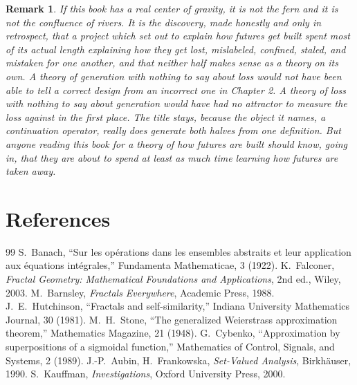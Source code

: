 \documentclass[11pt]{report}
\newtheorem{remark}{Remark}[chapter]
\begin{document}
\begin{remark}
If this book has a real center of gravity, it is not the fern and it
is not the confluence of rivers. It is the discovery, made honestly
and only in retrospect, that a project which set out to explain how
futures get built spent most of its actual length explaining how they
get lost, mislabeled, confined, staled, and mistaken for one another,
and that neither half makes sense as a theory on its own. A theory of
generation with nothing to say about loss would not have been able to
tell a correct design from an incorrect one in Chapter 2. A theory of
loss with nothing to say about generation would have had no attractor
to measure the loss against in the first place. The title stays,
because the object it names, a continuation operator, really does
generate both halves from one definition. But anyone reading this book
for a theory of how futures are built should know, going in, that they
are about to spend at least as much time learning how futures are
taken away.
\end{remark}

\chapter*{References}

\begin{thebibliography}{99}
S.\ Banach, ``Sur les op\'erations dans les
ensembles abstraits et leur application aux \'equations
int\'egrales,'' Fundamenta Mathematicae, 3 (1922).
K.\ Falconer, \emph{Fractal Geometry:
Mathematical Foundations and Applications}, 2nd ed., Wiley, 2003.
M.\ Barnsley, \emph{Fractals Everywhere},
Academic Press, 1988.
J.\ E.\ Hutchinson, ``Fractals and
self-similarity,'' Indiana University Mathematics Journal, 30 (1981).
M.\ H.\ Stone, ``The generalized Weierstrass
approximation theorem,'' Mathematics Magazine, 21 (1948).
G.\ Cybenko, ``Approximation by superpositions
of a sigmoidal function,'' Mathematics of Control, Signals, and
Systems, 2 (1989).
J.-P.\ Aubin, H.\ Frankowska,
\emph{Set-Valued Analysis}, Birkh\"auser, 1990.
S.\ Kauffman, \emph{Investigations}, Oxford
University Press, 2000.
\end{thebibliography}
\end{document}
